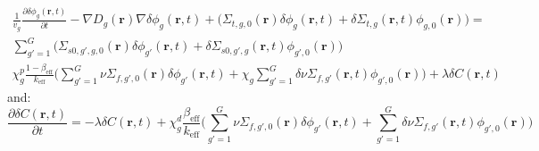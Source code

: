 \begin{equation}
        \begin{aligned}
                \frac{1}{v_g} \frac{\partial \delta \phi_g (\textbf{r}, t)}{\partial t} - \nabla D_g(\textbf{r}) \nabla \delta \phi_g(\textbf{r}, t) + \biggl(\Sigma_{t,g,0}(\textbf{r}) \delta \phi_g(\textbf{r}, t) + \delta \Sigma_{t,g}(\textbf{r}, t) \phi_{g,0}(\textbf{r}) \biggr) = \\
                \sum_{g' = 1}^{G} \biggl(\Sigma_{s0,g',g,0}(\textbf{r}) \delta \phi_{g'}(\textbf{r}, t) + \delta \Sigma_{s0,g',g}(\textbf{r}, t) \phi_{g',0}(\textbf{r}) \biggr)\\
                \chi^p_g \frac{1-\beta_{\text{eff}}}{k_{\text{eff}}} \biggl(\sum_{g' = 1}^{G} \nu \Sigma_{f,g',0}(\textbf{r}) \delta \phi_{g'}(\textbf{r}, t) + \chi_g \sum_{g' = 1}^{G} \delta \nu \Sigma_{f,g'}(\textbf{r}, t) \phi_{g',0}(\textbf{r}) \biggr) + \lambda \delta C(\textbf{r}, t)
        \end{aligned}
        \label{eq:time_1}
\end{equation}
and:
\begin{equation}
        \frac{\partial \delta C(\textbf{r}, t)}{\partial t} = - \lambda \delta C(\textbf{r}, t) + \chi^d_g \frac{\beta_{\text{eff}}}{k_{\text{eff}}}\biggl(\sum_{g' = 1}^{G} \nu \Sigma_{f,g',0}(\textbf{r}) \delta \phi_{g'}(\textbf{r}, t) + \sum_{g' = 1}^{G} \delta \nu \Sigma_{f,g'}(\textbf{r}, t) \phi_{g',0}(\textbf{r}) \biggr)
        \label{eq:time_2}
\end{equation}

